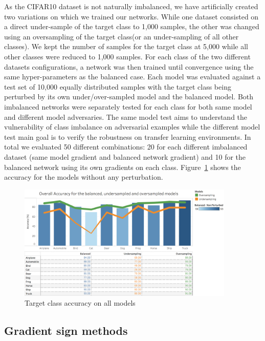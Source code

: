 \documentclass[runningheads,a4paper]{llncs}
\begin{document}
As the CIFAR10 dataset is not naturally imbalanced, we have artificially created two variations on which we trained our networks.  While one dataset consisted on a direct under-sample of the target class to 1,000 samples, the other was changed using  an oversampling of the target class(or an under-sampling of all other classes). We kept the number of samples for the target class at 5,000 while all other classes were reduced to 1,000 samples. For each class of the two different datasets configurations, a network was then trained until convergence using the same hyper-parameters as the balanced case. Each model was evaluated against a test set of 10,000 equally distributed samples with the target class being perturbed by its own under/over-sampled model and the balanced model. Both imbalanced networks were separately tested for each class for both same model and different model adversaries. The same model test aims to understand the vulnerability of class imbalance on adversarial examples while the different model test main goal is to verify the robustness on transfer learning environments. In total we evaluated 50 different combinations: 20 for each different imbalanced dataset (same model gradient and balanced network gradient) and 10 for the balanced network using its own gradients on each class. Figure~\ref{fig:acc_graph} shows the accuracy for the models without any perturbation.
\begin{figure}
	\centering
	\includegraphics[height=5.5cm]{graph_non_pert.png}
	\caption{Target class accuracy on all models}
	\label{fig:acc_graph}
\end{figure}



\subsection{Gradient sign methods}
\end{document}
